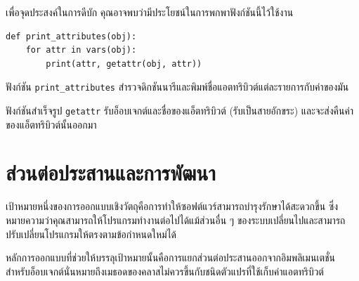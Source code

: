 เพื่อจุดประสงค์ในการดีบัก คุณอาจพบว่ามีประโยชน์ในการพกพาฟังก์ชันนี้ไว้ใช้งาน

\begin{verbatim}
def print_attributes(obj):
    for attr in vars(obj):
        print(attr, getattr(obj, attr))
\end{verbatim}
%

ฟังก์ชัน \verb"print_attributes" สำรวจดิกชันนารีและพิมพ์ชื่อแอตทริบิวต์แต่ละรายการกับค่าของมัน


ฟังก์ชันสำเร็จรูป {\tt getattr} รับอ็อบเจกต์และชื่อของแอ็ตทริบิวต์ (รับเป็นสายอักขระ) และจะส่งคืนค่าของแอ็ตทริบิวต์นั้นออกมา


\section{ส่วนต่อประสานและการพัฒนา} %


เป้าหมายหนึ่งของการออกแบบเชิงวัตถุคือการทำให้ซอฟต์แวร์สามารถบำรุงรักษาได้สะดวกขึ้น 
ซึ่งหมายความว่าคุณสามารถให้โปรแกรมทำงานต่อไปได้แม้ส่วนอื่น ๆ ของระบบเปลี่ยนไปและสามารถปรับเปลี่ยนโปรแกรมให้ตรงตามข้อกำหนดใหม่ได้


หลักการออกแบบที่ช่วยให้บรรลุเป้าหมายนั้นคือการแยกส่วนต่อประสานออกจากอิมพลิเมนเตชั่น สำหรับอ็อบเจกต์นั่นหมายถึงเมธอดของคลาสไม่ควรขึ้นกับชนิดตัวแปรที่ใช้เก็บค่าแอตทริบิวต์


